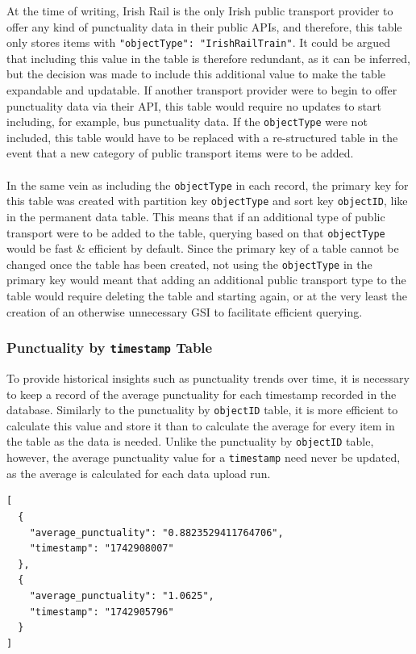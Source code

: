 \documentclass[a4paper,11pt]{report}
\newenvironment{code}{\captionsetup{type=listing}}{}
\begin{document}
At the time of writing, Irish Rail is the only Irish public transport provider to offer any kind of punctuality data in their public APIs, and therefore, this table only stores items with \texttt{"objectType": "IrishRailTrain"}.
It could be argued that including this value in the table is therefore redundant, as it can be inferred, but the decision was made to include this additional value to make the table expandable and updatable.
If another transport provider were to begin to offer punctuality data via their API, this table would require no updates to start including, for example, bus punctuality data.
If the \verb|objectType| were not included, this table would have to be replaced with a re-structured table in the event that a new category of public transport items were to be added.
\\\\
In the same vein as including the \verb|objectType| in each record, the primary key for this table was created with partition key \verb|objectType| and sort key \verb|objectID|, like in the permanent data table.
This means that if an additional type of public transport were to be added to the table, querying based on that \verb|objectType| would be fast \& efficient by default.
Since the primary key of a table cannot be changed once the table has been created, not using the \verb|objectType| in the primary key would meant that adding an additional public transport type to the table would require deleting the table and starting again, or at the very least the creation of an otherwise unnecessary GSI to facilitate efficient querying.

\subsubsection{Punctuality by \texttt{timestamp} Table}
To provide historical insights such as punctuality trends over time, it is necessary to keep a record of the average punctuality for each timestamp recorded in the database.
Similarly to the punctuality by \verb|objectID| table, it is more efficient to calculate this value and store it than to calculate the average for every item in the table as the data is needed.
Unlike the punctuality by \verb|objectID| table, however, the average punctuality value for a \verb|timestamp| need never be updated, as the average is calculated for each data upload run.

\begin{code}
\begin{verbatim}
[
  {
    "average_punctuality": "0.8823529411764706",
    "timestamp": "1742908007"
  },
  {
    "average_punctuality": "1.0625",
    "timestamp": "1742905796"
  }
]
\end{verbatim}
\caption{Sample of items from the average punctuality by \texttt{timestamp} table}
\end{code}
\end{document}
